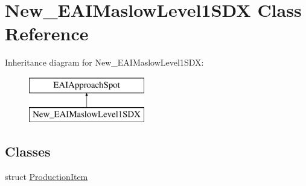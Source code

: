 \hypertarget{class_new___e_a_i_maslow_level1_s_d_x}{}\section{New\+\_\+\+E\+A\+I\+Maslow\+Level1\+S\+DX Class Reference}
\label{class_new___e_a_i_maslow_level1_s_d_x}
Inheritance diagram for New\+\_\+\+E\+A\+I\+Maslow\+Level1\+S\+DX\+:\begin{figure}[H]
\begin{center}
\leavevmode
\includegraphics[height=2.000000cm]{d5/d8f/class_new___e_a_i_maslow_level1_s_d_x}
\end{center}
\end{figure}
\subsection*{Classes}
\begin{DoxyCompactItemize}
\item 
struct \mbox{\hyperlink{struct_new___e_a_i_maslow_level1_s_d_x_1_1_production_item}{Production\+Item}}
\end{DoxyCompactItemize}
